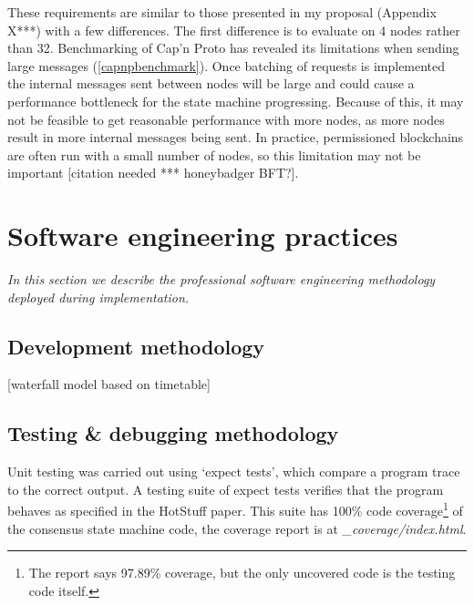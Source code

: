 These requirements are similar to those presented in my proposal (Appendix X***) with a few differences. The first difference is to evaluate on 4 nodes rather than 32. Benchmarking of Cap'n Proto has revealed its limitations when sending large messages (\ref{capnpbenchmark}). Once batching of requests is implemented the internal messages sent between nodes will be large and could cause a performance bottleneck for the state machine progressing. Because of this, it may not be feasible to get reasonable performance with more nodes, as more nodes result in more internal messages being sent. In practice, permissioned blockchains are often run with a small number of nodes, so this limitation may not be important [citation needed *** honeybadger BFT?].


\section{Software engineering practices} \label{softwareeng}

\textit{In this section we describe the professional software engineering methodology deployed during implementation.}

\subsection{Development methodology}

[waterfall model based on timetable]

\subsection{Testing \& debugging methodology} \label{testing}

Unit testing was carried out using `expect tests', which compare a program trace to the correct output. A testing suite of expect tests verifies that the program behaves as specified in the HotStuff paper. This suite has 100\% code coverage\footnote{The report says 97.89\% coverage, but the only uncovered code is the testing code itself.} of the consensus state machine code, the coverage report is at \textit{\_coverage/index.html}.

